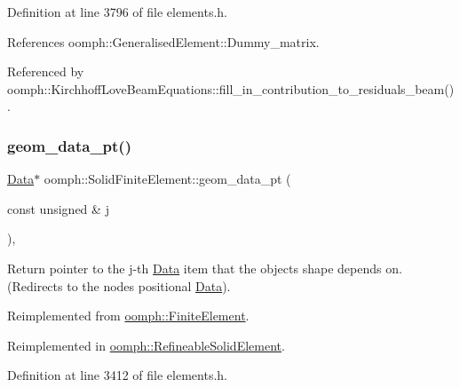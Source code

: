 Definition at line 3796 of file elements.\+h.



References oomph\+::\+Generalised\+Element\+::\+Dummy\+\_\+matrix.



Referenced by oomph\+::\+Kirchhoff\+Love\+Beam\+Equations\+::fill\+\_\+in\+\_\+contribution\+\_\+to\+\_\+residuals\+\_\+beam().

\mbox{\label{classoomph_1_1SolidFiniteElement_a2457ad75b45257b536090d9b1a6f1331}} 
\subsubsection{\texorpdfstring{geom\+\_\+data\+\_\+pt()}{geom\_data\_pt()}}
{\footnotesize\ttfamily \hyperlink{classoomph_1_1Data}{Data}$\ast$ oomph\+::\+Solid\+Finite\+Element\+::geom\+\_\+data\+\_\+pt (\begin{DoxyParamCaption}\item[{const unsigned \&}]{j }\end{DoxyParamCaption})\hspace{0.3cm}{\ttfamily [inline]}, {\ttfamily [virtual]}}



Return pointer to the j-\/th \hyperlink{classoomph_1_1Data}{Data} item that the object\textquotesingle{}s shape depends on. (Redirects to the nodes\textquotesingle{} positional \hyperlink{classoomph_1_1Data}{Data}). 



Reimplemented from \hyperlink{classoomph_1_1FiniteElement_aa119a9aaad3d2ebb54ff085726c3708d}{oomph\+::\+Finite\+Element}.



Reimplemented in \hyperlink{classoomph_1_1RefineableSolidElement_a3f20de56e3a920644b01dac184f67ef1}{oomph\+::\+Refineable\+Solid\+Element}.



Definition at line 3412 of file elements.\+h.

\mbox{\label{classoomph_1_1SolidFiniteElement_a8d27c8dff0043ed5b40791c41f6b88bd}} 
